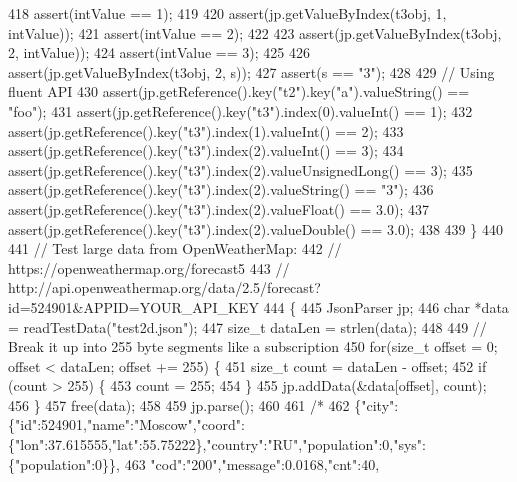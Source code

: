 \begin{DoxyCode}
{{{{{{418         assert(intValue == 1);
419 
420         assert(jp.getValueByIndex(t3obj, 1, intValue));
421         assert(intValue == 2);
422 
423         assert(jp.getValueByIndex(t3obj, 2, intValue));
424         assert(intValue == 3);
425 
426         assert(jp.getValueByIndex(t3obj, 2, s));
427         assert(s == \textcolor{stringliteral}{"3"});
428 
429         \textcolor{comment}{// Using fluent API}
430         assert(jp.getReference().key(\textcolor{stringliteral}{"t2"}).key(\textcolor{stringliteral}{"a"}).valueString() == \textcolor{stringliteral}{"foo"});
431         assert(jp.getReference().key(\textcolor{stringliteral}{"t3"}).index(0).valueInt() == 1);
432         assert(jp.getReference().key(\textcolor{stringliteral}{"t3"}).index(1).valueInt() == 2);
433         assert(jp.getReference().key(\textcolor{stringliteral}{"t3"}).index(2).valueInt() == 3);
434         assert(jp.getReference().key(\textcolor{stringliteral}{"t3"}).index(2).valueUnsignedLong() == 3);
435         assert(jp.getReference().key(\textcolor{stringliteral}{"t3"}).index(2).valueString() == \textcolor{stringliteral}{"3"});
436         assert(jp.getReference().key(\textcolor{stringliteral}{"t3"}).index(2).valueFloat() == 3.0);
437         assert(jp.getReference().key(\textcolor{stringliteral}{"t3"}).index(2).valueDouble() == 3.0);
438 
439     \}
440 
441     \textcolor{comment}{// Test large data from OpenWeatherMap:}
442     \textcolor{comment}{// https://openweathermap.org/forecast5}
443     \textcolor{comment}{// http://api.openweathermap.org/data/2.5/forecast?id=524901&APPID=YOUR\_API\_KEY}
444     \{
445         JsonParser jp;
446         \textcolor{keywordtype}{char} *data = readTestData(\textcolor{stringliteral}{"test2d.json"});
447         \textcolor{keywordtype}{size\_t} dataLen = strlen(data);
448 
449         \textcolor{comment}{// Break it up into 255 byte segments like a subscription}
450         \textcolor{keywordflow}{for}(\textcolor{keywordtype}{size\_t} offset = 0; offset < dataLen; offset += 255) \{
451             \textcolor{keywordtype}{size\_t} count = dataLen - offset;
452             \textcolor{keywordflow}{if} (count > 255) \{
453                 count = 255;
454             \}
455             jp.addData(&data[offset], count);
456         \}
457         free(data);
458 
459         jp.parse();
460 
461         \textcolor{comment}{/*}
462 \textcolor{comment}{        
      \{"city":\{"id":524901,"name":"Moscow","coord":\{"lon":37.615555,"lat":55.75222\},"country":"RU","population":0,"sys":\{"population":0\}\},}
463 \textcolor{comment}{            "cod":"200","message":0.0168,"cnt":40,}
}}}}}}
\end{DoxyCode}
